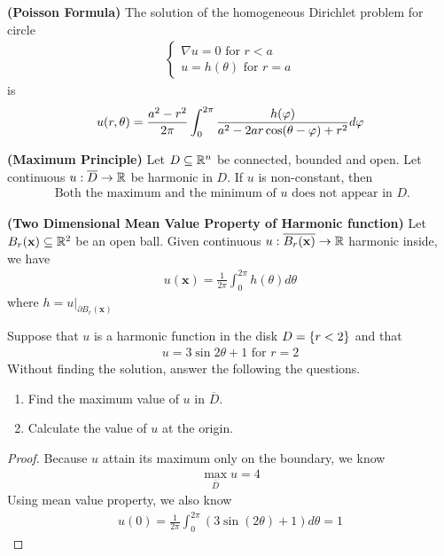 \documentclass{report}
\begin{document}
\begin{theorem}
\textbf{(Poisson Formula)} The solution of the homogeneous Dirichlet problem for circle 
\begin{align*}
\begin{cases}
  \nabla u = 0 \text{ for }r<a \\
  u = h (\theta)\text{ for }r=a
\end{cases}
\end{align*}
is 
\begin{align*}
u(r,\theta)= \frac{a^2-r^2}{2\pi } \int_0^{2\pi } \frac{h (\pfi)}{a^2-2ar \cos (\theta - \pfi)+ r^2} d \pfi
\end{align*}
\end{theorem}
\begin{theorem}
\textbf{(Maximum Principle)} Let $D\subseteq \mathbb{R}^n$ be connected, bounded and open. Let continuous $u:\overline{D}\rightarrow \mathbb{R}$ be harmonic in $D$. If  $u$ is non-constant, then 
\begin{align*}
\text{ Both the maximum and the minimum of $u$ does not appear in }D.
\end{align*}
\end{theorem}
\begin{theorem}
\textbf{(Two Dimensional Mean Value Property of Harmonic function)} Let $B_r(\textbf{x})\subseteq \mathbb{R}^2$ be an open ball. Given continuous $u:\overline{B_r(\textbf{x})}\rightarrow \mathbb{R}$ harmonic inside, we have  
\begin{align*}
u(\textbf{x})= \frac{1}{2\pi }\int_0^{2\pi } h(\theta)d\theta
\end{align*}
where $h=u|_{\partial B_r (\textbf{x})}$ 
\end{theorem}
\begin{question}{}{}
Suppose that $u$ is a harmonic function in the disk $D =\{ r<2 \}$ and that 
\begin{align*}
u= 3 \sin 2 \theta + 1\text{ for }r=2
\end{align*}
Without finding the solution, answer the following the questions. 
\begin{enumerate}[label=(\alph*)]
  \item Find the maximum value of $u$ in $\overline{D}$. 
  \item Calculate the value of $u$ at the origin. 
\end{enumerate}
\end{question}
\begin{proof}
Because $u$ attain its maximum only on the boundary, we know 
\begin{align*}
\max_{\overline{D}}u= 4
\end{align*}
Using mean value property, we also know  
\begin{align*}
u(0)= \frac{1}{2\pi }\int_{0}^{2\pi } (3 \sin (2\theta)+1)d \theta = 1
\end{align*}
\end{proof}
\end{document}
